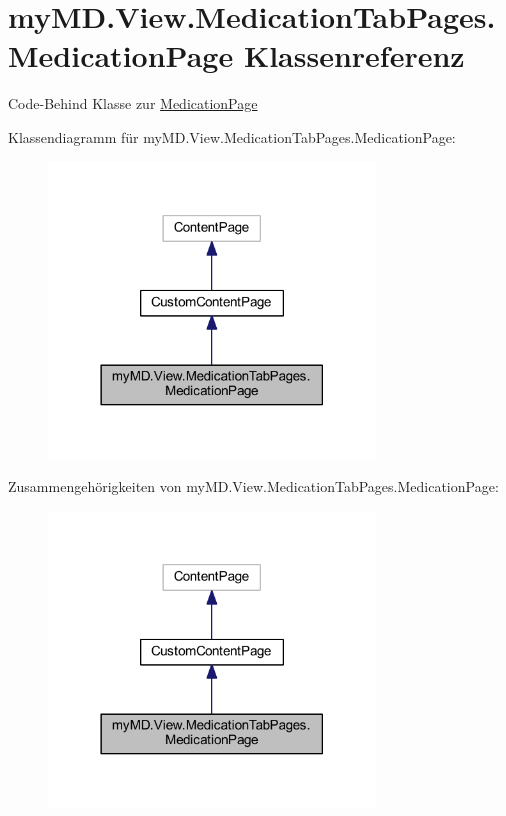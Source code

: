 \hypertarget{classmy_m_d_1_1_view_1_1_medication_tab_pages_1_1_medication_page}{}\section{my\+M\+D.\+View.\+Medication\+Tab\+Pages.\+Medication\+Page Klassenreferenz}
\label{classmy_m_d_1_1_view_1_1_medication_tab_pages_1_1_medication_page}


Code-\/\+Behind Klasse zur \mbox{\hyperlink{classmy_m_d_1_1_view_1_1_medication_tab_pages_1_1_medication_page}{Medication\+Page}}  




Klassendiagramm für my\+M\+D.\+View.\+Medication\+Tab\+Pages.\+Medication\+Page\+:\nopagebreak
\begin{figure}[H]
\begin{center}
\leavevmode
\includegraphics[width=246pt]{classmy_m_d_1_1_view_1_1_medication_tab_pages_1_1_medication_page__inherit__graph}
\end{center}
\end{figure}


Zusammengehörigkeiten von my\+M\+D.\+View.\+Medication\+Tab\+Pages.\+Medication\+Page\+:\nopagebreak
\begin{figure}[H]
\begin{center}
\leavevmode
\includegraphics[width=246pt]{classmy_m_d_1_1_view_1_1_medication_tab_pages_1_1_medication_page__coll__graph}
\end{center}
\end{figure}
